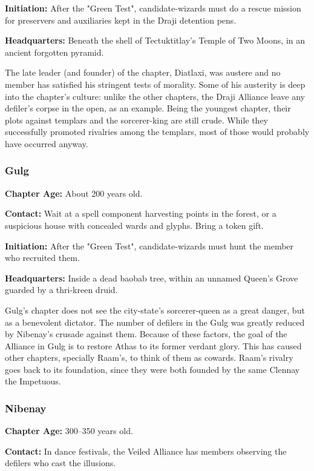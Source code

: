 \textbf{Initiation:} After the "Green Test", candidate-wizards must do a rescue mission for preservers and auxiliaries kept in the Draji detention pens.

\textbf{Headquarters:} Beneath the shell of Tectuktitlay's Temple of Two Moons, in an ancient forgotten pyramid.

The late leader (and founder) of the chapter, Diatlaxi, was austere and no member has satisfied his stringent tests of morality. Some of his austerity is deep into the chapter's culture: unlike the other chapters, the Draji Alliance leave any defiler's corpse in the open, as an example. Being the youngest chapter, their plots against templars and the sorcerer-king are still crude. While they successfully promoted rivalries among the templars, most of those would probably have occurred anyway.


\subsubsection{Gulg}
\textbf{Chapter Age:} About 200 years old.

\textbf{Contact:} Wait at a spell component harvesting points in the forest, or a suspicious house with concealed wards and glyphs. Bring a token gift.

\textbf{Initiation:} After the "Green Test", candidate-wizards must hunt the member who recruited them.

\textbf{Headquarters:} Inside a dead baobab tree, within an unnamed Queen's Grove guarded by a thri-kreen druid.

Gulg's chapter does not see the city-state's sorcerer-queen as a great danger, but as a benevolent dictator. The number of defilers in the Gulg was greatly reduced by Nibenay's crusade against them. Because of these factors, the goal of the Alliance in Gulg is to restore Athas to its former verdant glory. This has caused other chapters, specially Raam's, to think of them as cowards. Raam's rivalry goes back to its foundation, since they were both founded by the same Clennay the Impetuous.


\subsubsection{Nibenay}
\textbf{Chapter Age:} 300--350 years old.

\textbf{Contact:} In dance festivals, the Veiled Alliance has members observing the defilers who cast the illusions.


